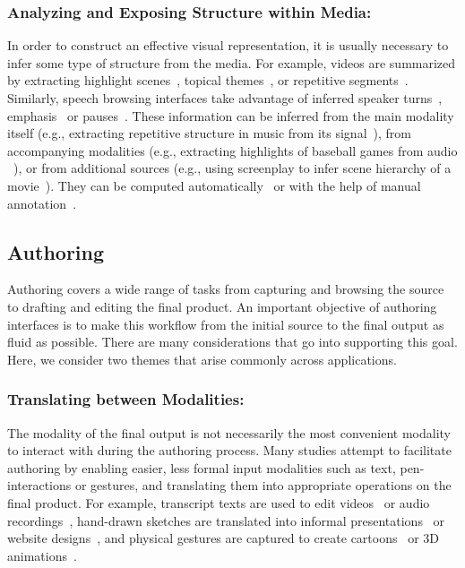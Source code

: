\subsubsection*{Analyzing and Exposing Structure within Media:}
In order to construct an effective visual representation, it is usually necessary to infer some type of structure from the media. For example, videos are summarized by extracting highlight scenes~\cite{chen2011formulating,fleischman2007temporal}, topical themes~\cite{wu2006threading}, or repetitive segments~\cite{Chu_2015_CVPR,Zhao_2014_CVPR}. Similarly, speech browsing interfaces take advantage of inferred speaker turns~\cite{wilcox1994segmentation}, emphasis~\cite{arons1994interactively} or pauses~\cite{arons1997speechskimmer}. These information can be inferred from the main modality itself (e.g., extracting repetitive structure in music from its signal~\cite{cooper2003summarizing}), from accompanying modalities (e.g., extracting highlights of baseball games from audio ~\cite{rui2000automatically}), or from additional sources (e.g., using screenplay to infer scene hierarchy of a movie~\cite{cour2008movie,pavel2015sceneskim}). They can be computed automatically~\cite{cooper2003summarizing,rui2000automatically,pavel2015sceneskim} or with the help of manual annotation~\cite{chi2013democut,pavel2014video}.\\

\subsection{Authoring}
\label{sec:relatedwork-authoring}
Authoring covers a wide range of tasks from capturing and browsing the source to drafting and editing the final product. An important objective of authoring interfaces is to make this workflow from the initial source to the final output as fluid as possible. There are many considerations that go into supporting this goal. Here, we consider two themes that arise commonly across applications. 

\subsubsection*{Translating between Modalities:} The modality of the final output is not necessarily the most convenient modality to interact with during the authoring process. Many studies attempt to facilitate authoring by enabling easier, less formal input modalities such as text, pen-interactions or gestures, and translating them into appropriate operations on the final product. For example, transcript texts are used to edit videos~\cite{berthouzoz2012tools,casares2002simplifying} or audio recordings~\cite{rubin2013content}, hand-drawn sketches are translated into informal presentations~\cite{li2003sketching} or website designs~\cite{lin2000denim}, and physical gestures are captured to create cartoons~\cite{nara2013manga} or 3D animations~\cite{held20123d}.\\

